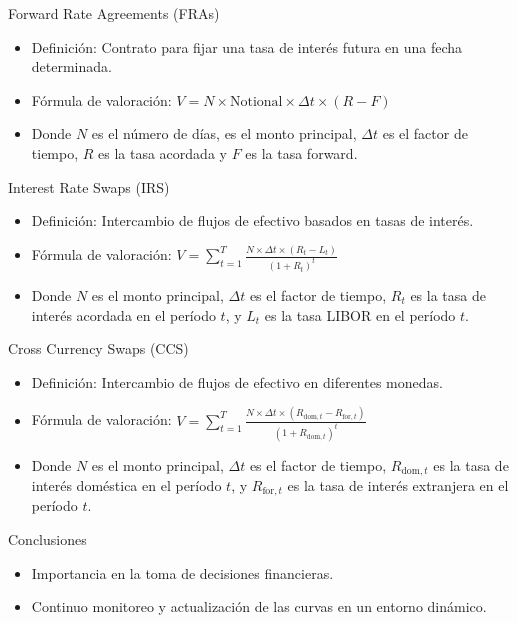 \documentclass{beamer}
\begin{document}
	\begin{frame}{Forward Rate Agreements (FRAs)}
		\begin{itemize}
			\item Definición: Contrato para fijar una tasa de interés futura en una fecha determinada.
			\item Fórmula de valoración: $V = N \times \text{Notional} \times \Delta t \times (R - F)$
			\item Donde $N$ es el número de días,  es el monto principal, $\Delta t$ es el factor de tiempo, $R$ es la tasa acordada y $F$ es la tasa forward.
		\end{itemize}
	\end{frame}
	
	\begin{frame}{Interest Rate Swaps (IRS)}
		\begin{itemize}
			\item Definición: Intercambio de flujos de efectivo basados en tasas de interés.
			\item Fórmula de valoración: $V = \sum_{t=1}^{T} \frac{N \times \Delta t \times (R_t - L_t)}{(1+R_t)^t}$
			\item Donde $N$ es el monto principal, $\Delta t$ es el factor de tiempo, $R_t$ es la tasa de interés acordada en el período $t$, y $L_t$ es la tasa LIBOR en el período $t$.
		\end{itemize}
	\end{frame}
	
	\begin{frame}{Cross Currency Swaps (CCS)}
		\begin{itemize}
			\item Definición: Intercambio de flujos de efectivo en diferentes monedas.
			\item Fórmula de valoración: $V = \sum_{t=1}^{T} \frac{N \times \Delta t \times (R_{\text{dom}, t} - R_{\text{for}, t})}{(1+R_{\text{dom}, t})^t}$
			\item Donde $N$ es el monto principal, $\Delta t$ es el factor de tiempo, $R_{\text{dom}, t}$ es la tasa de interés doméstica en el período $t$, y $R_{\text{for}, t}$ es la tasa de interés extranjera en el período $t$.
		\end{itemize}
	\end{frame}
	
	
	\begin{frame}{Conclusiones}
		\begin{itemize}
			\item Importancia en la toma de decisiones financieras.
			\item Continuo monitoreo y actualización de las curvas en un entorno dinámico.
		\end{itemize}
	\end{frame}
	
\end{document}
